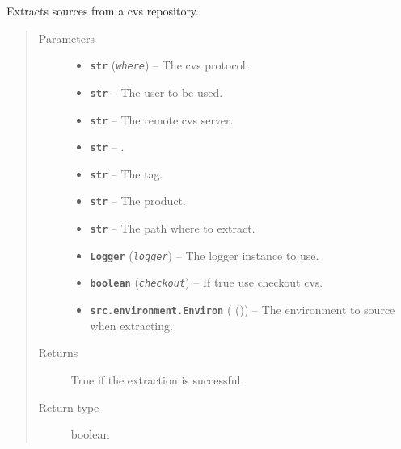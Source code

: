 \documentclass[a4paper,10pt,english]{sphinxmanual}
\begin{document}
\begin{fulllineitems}
\label{commands/apidoc/src:src.system.cvs_extract}
Extracts sources from a cvs repository.
\begin{quote}\begin{description}
\item[{Parameters}] \leavevmode\begin{itemize}
\item {} 
\textbf{\texttt{str}} (\emph{\texttt{where}}) -- The cvs protocol.

\item {} 
\textbf{\texttt{str}} -- The user to be used.

\item {} 
\textbf{\texttt{str}} -- The remote cvs server.

\item {} 
\textbf{\texttt{str}} -- 
.


\item {} 
\textbf{\texttt{str}} -- The tag.

\item {} 
\textbf{\texttt{str}} -- The product.

\item {} 
\textbf{\texttt{str}} -- The path where to extract.

\item {} 
\textbf{\texttt{Logger}} (\emph{\texttt{logger}}) -- The logger instance to use.

\item {} 
\textbf{\texttt{boolean}} (\emph{\texttt{checkout}}) -- If true use checkout cvs.

\item {} 
\textbf{\texttt{src.environment.Environ}} ({\hyperref[commands/apidoc/src:module\string-src.environment]{}} ()) -- The environment to source when
extracting.

\end{itemize}

\item[{Returns}] \leavevmode
True if the extraction is successful

\item[{Return type}] \leavevmode
boolean

\end{description}\end{quote}

\end{fulllineitems}
\end{document}
